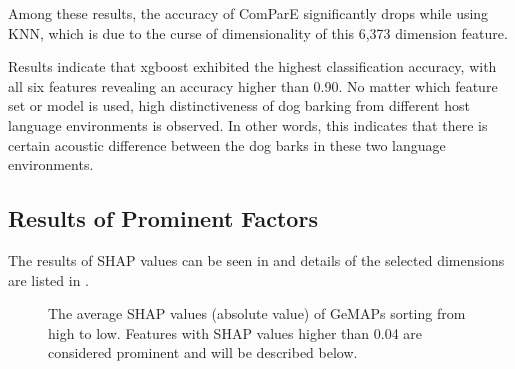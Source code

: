 Among these results, the accuracy of ComParE significantly drops while using KNN, which is due to the curse of dimensionality of this 6,373 dimension feature.

Results indicate that xgboost exhibited the highest classification accuracy, with all six features revealing an accuracy higher than 0.90. No matter which feature set or model is used, high distinctiveness of dog barking from different host language environments is observed. In other words, this indicates that there is certain acoustic difference between the dog barks in these two language environments. 




\subsection{Results of Prominent Factors}
\label{sec:prominentfactor}
The results of SHAP values can be seen in  and details of the selected dimensions are listed in .

\begin{figure}[th]
	\centering
	\caption{The average SHAP values (absolute value) of GeMAPs sorting from high to low. Features with SHAP values higher than 0.04 are considered prominent and will be described below.} %
	\label{fig:prominentfig} %
\end{figure}



